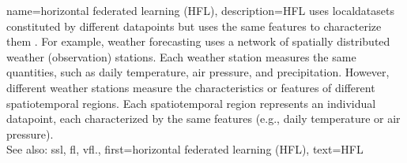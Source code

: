 {name={horizontal federated learning (HFL)},
	description={HFL uses \glspl{localdataset} constitut\-ed by different
	   	\glspl{datapoint} but uses the same \glspl{feature} to characterize them \cite{HFLChapter2020}.
		For example, weather forecasting uses a network of spatially distributed
		weather (observation) stations. Each weather station measures the
		same quantities, such as daily temperature, air pressure, and precipitation.
		However, different weather stations measure the characteristics or
		\glspl{feature} of different spatiotemporal regions. Each spatiotemporal region 
		represents an individual \gls{datapoint}, each characterized by the same \glspl{feature} 
		(e.g., daily temperature or air pressure).
		\\
		See also: \gls{ssl}, \gls{fl}, \gls{vfl}.},
	first={horizontal federated learning (HFL)},
	text={HFL}
} 


